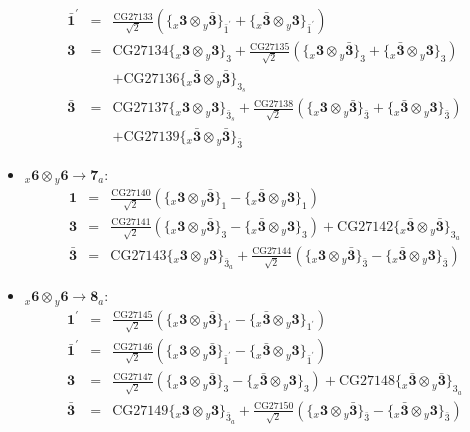 \documentclass[english]{article}
\newcommand{\rep}[1]{\mathbf{#1}}
\newcommand{\repx}[2]{{}_{#2}\mathbf{#1}}
\newcommand{\subcg}[3]{\big\{ \repx{#1}{x}\otimes\repx{#2}{y}\big\}^{}_{#3}}
\begin{document}
\begin{itemize}
\begin{eqnarray*}
\\
\rep{\bar{1}^{\prime}} &=& \frac{\text{CG27133}}{\sqrt{2}}\left(\subcg{3}{\bar{3}}{\bar{1}^{\prime}}+\subcg{\bar{3}}{3}{\bar{1}^{\prime}}\right)
\\
\rep{3} &=& \text{CG27134}\subcg{3}{3}{3}+\frac{\text{CG27135}}{\sqrt{2}}\left(\subcg{3}{\bar{3}}{3}+\subcg{\bar{3}}{3}{3}\right) \\ 
 & & +\text{CG27136}\subcg{\bar{3}}{\bar{3}}{3_{s}}
\\
\rep{\bar{3}} &=& \text{CG27137}\subcg{3}{3}{\bar{3}_{s}}+\frac{\text{CG27138}}{\sqrt{2}}\left(\subcg{3}{\bar{3}}{\bar{3}}+\subcg{\bar{3}}{3}{\bar{3}}\right) \\ 
 & & +\text{CG27139}\subcg{\bar{3}}{\bar{3}}{\bar{3}}
\end{eqnarray*}
\item $\repx{6}{x}\otimes\repx{6}{y}\to\rep{7}_{a}$:
\begin{eqnarray*}
\rep{1} &=& \frac{\text{CG27140}}{\sqrt{2}}\left(\subcg{3}{\bar{3}}{1}-\subcg{\bar{3}}{3}{1}\right)
\\
\rep{3} &=& \frac{\text{CG27141}}{\sqrt{2}}\left(\subcg{3}{\bar{3}}{3}-\subcg{\bar{3}}{3}{3}\right)+\text{CG27142}\subcg{\bar{3}}{\bar{3}}{3_{a}}
\\
\rep{\bar{3}} &=& \text{CG27143}\subcg{3}{3}{\bar{3}_{a}}+\frac{\text{CG27144}}{\sqrt{2}}\left(\subcg{3}{\bar{3}}{\bar{3}}-\subcg{\bar{3}}{3}{\bar{3}}\right)
\end{eqnarray*}
\item $\repx{6}{x}\otimes\repx{6}{y}\to\rep{8}_{a}$:
\begin{eqnarray*}
\rep{1^{\prime}} &=& \frac{\text{CG27145}}{\sqrt{2}}\left(\subcg{3}{\bar{3}}{1^{\prime}}-\subcg{\bar{3}}{3}{1^{\prime}}\right)
\\
\rep{\bar{1}^{\prime}} &=& \frac{\text{CG27146}}{\sqrt{2}}\left(\subcg{3}{\bar{3}}{\bar{1}^{\prime}}-\subcg{\bar{3}}{3}{\bar{1}^{\prime}}\right)
\\
\rep{3} &=& \frac{\text{CG27147}}{\sqrt{2}}\left(\subcg{3}{\bar{3}}{3}-\subcg{\bar{3}}{3}{3}\right)+\text{CG27148}\subcg{\bar{3}}{\bar{3}}{3_{a}}
\\
\rep{\bar{3}} &=& \text{CG27149}\subcg{3}{3}{\bar{3}_{a}}+\frac{\text{CG27150}}{\sqrt{2}}\left(\subcg{3}{\bar{3}}{\bar{3}}-\subcg{\bar{3}}{3}{\bar{3}}\right)
\end{eqnarray*}
\end{itemize}
\end{document}
